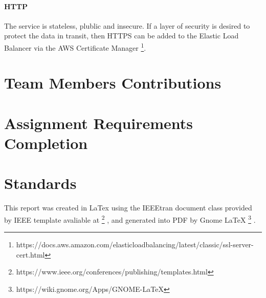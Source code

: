 \documentclass[conference]{IEEEtran}
\begin{document}
\paragraph{HTTP}
The service is stateless, plublic and insecure. If a layer of security is desired to protect the data in transit, then HTTPS can be added to the Elastic Load Balancer via the AWS Certificate Manager \footnote{https://docs.aws.amazon.com/elasticloadbalancing/latest/classic/ssl-server-cert.html}.
\section{Team Members Contributions}
\section{Assignment Requirements Completion}
\section{Standards}
This report was created in LaTex using the IEEEtran document class provided by IEEE template avaliable at
\footnote{https://www.ieee.org/conferences/publishing/templates.html}
, and generated into PDF by Gnome LaTeX
\footnote{https://wiki.gnome.org/Apps/GNOME-LaTeX}
.
\end{document}
